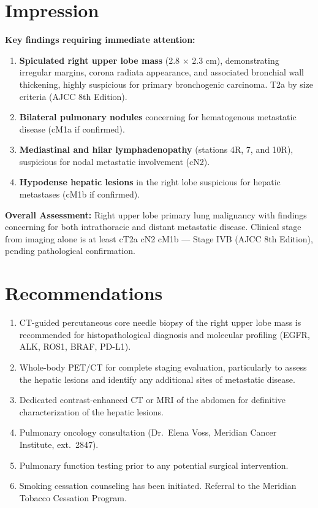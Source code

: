 \documentclass[11pt]{article}
\begin{document}
\section{Impression}

\begin{alertbox}
\textbf{Key findings requiring immediate attention:}
\end{alertbox}

\vspace{6pt}

\begin{enumerate}[leftmargin=*, itemsep=6pt, topsep=4pt]
  \item \textbf{Spiculated right upper lobe mass} (2.8 $\times$ 2.3 cm), demonstrating irregular margins, corona radiata appearance, and associated bronchial wall thickening, highly suspicious for primary bronchogenic carcinoma. T2a by size criteria (AJCC 8th Edition).
  \item \textbf{Bilateral pulmonary nodules} concerning for hematogenous metastatic disease (cM1a if confirmed).
  \item \textbf{Mediastinal and hilar lymphadenopathy} (stations 4R, 7, and 10R), suspicious for nodal metastatic involvement (cN2).
  \item \textbf{Hypodense hepatic lesions} in the right lobe suspicious for hepatic metastases (cM1b if confirmed).
\end{enumerate}

\vspace{6pt}

\textbf{Overall Assessment:} Right upper lobe primary lung malignancy with findings concerning for both intrathoracic and distant metastatic disease. Clinical stage from imaging alone is at least cT2a cN2 cM1b --- Stage IVB (AJCC 8th Edition), pending pathological confirmation.

\section{Recommendations}

\begin{enumerate}[leftmargin=*, itemsep=4pt, topsep=4pt]
  \item CT-guided percutaneous core needle biopsy of the right upper lobe mass is recommended for histopathological diagnosis and molecular profiling (EGFR, ALK, ROS1, BRAF, PD-L1).
  \item Whole-body PET/CT for complete staging evaluation, particularly to assess the hepatic lesions and identify any additional sites of metastatic disease.
  \item Dedicated contrast-enhanced CT or MRI of the abdomen for definitive characterization of the hepatic lesions.
  \item Pulmonary oncology consultation (Dr.\ Elena Voss, Meridian Cancer Institute, ext.\ 2847).
  \item Pulmonary function testing prior to any potential surgical intervention.
  \item Smoking cessation counseling has been initiated. Referral to the Meridian Tobacco Cessation Program.
\end{enumerate}
\end{document}
